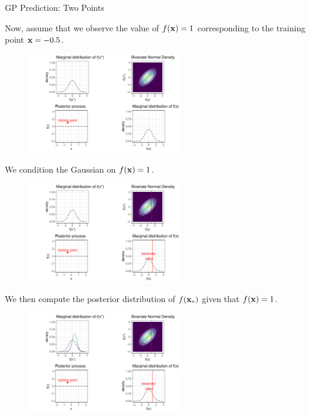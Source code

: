 \begin{frame}[c,allowframebreaks]{GP Prediction: Two Points}
\framebreak

Now, assume that we observe the value of $f(\mathbf{x}) = 1$ corresponding to the training point $\mathbf{x} = -0.5$. 


\begin{figure}
\includegraphics[width=0.6\textwidth]{figure/gp-posterior-2-1.pdf}\par
\end{figure}


\framebreak

We condition the Gaussian on $f(\mathbf{x}) = 1$. 


\begin{figure}
\includegraphics[width=0.6\textwidth]{figure/gp-posterior-3-1.pdf}\par
\end{figure}

\framebreak

We then compute the posterior distribution of $f(\mathbf{x}_*)$ given that $f(\mathbf{x}) = 1$.


\begin{figure}
\includegraphics[width=0.6\textwidth]{figure/gp-posterior-5-1.pdf}\par
\end{figure}



\end{frame}
